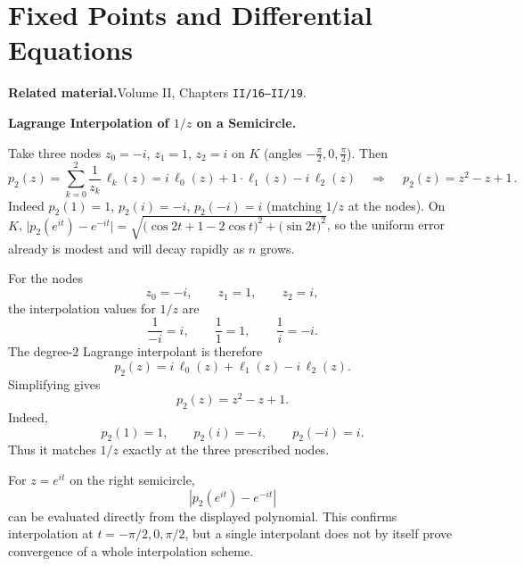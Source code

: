 \section{Fixed Points and Differential Equations}

\par\medskip\noindent\textbf{Related material.}\quad  Volume II, Chapters \texttt{II/16--II/19}.

\begin{problem}[CP-II-0018]
\label{prob:cp-ii-0018}
\textbf{Lagrange Interpolation of \(1/z\) on a Semicircle.}

\hspace*{1.5em}Take three nodes $z_0=-i$, $z_1=1$, $z_2=i$ on $K$ (angles $-\tfrac\pi2,0,\tfrac\pi2$).
	Then
	\[
	p_2(z)=\sum_{k=0}^{2}\frac{1}{z_k}\,\ell_k(z)
	= i\,\ell_0(z)+1\cdot \ell_1(z)-i\,\ell_2(z)
	\quad\Rightarrow\quad
	\boxed{\,p_2(z)=z^2 - z + 1\,}.
	\]
	Indeed $p_2(1)=1$, $p_2(i)=-i$, $p_2(-i)=i$ (matching $1/z$ at the nodes). On $K$,
	$\big|p_2(e^{it})-e^{-it}\big|
	=\sqrt{\big(\cos2t+1-2\cos t\big)^2+\big(\sin2t\big)^2}$,
	so the uniform error already is modest and will decay rapidly as $n$ grows.
\end{problem}

\begin{solution}
For the nodes
\[
z_0=-i,\qquad z_1=1,\qquad z_2=i,
\]
the interpolation values for \(1/z\) are
\[
\frac1{-i}=i,
\qquad
\frac11=1,
\qquad
\frac1i=-i.
\]
The degree-\(2\) Lagrange interpolant is therefore
\[
p_2(z)
=
i\,\ell_0(z)
+
\ell_1(z)
-
i\,\ell_2(z).
\]
Simplifying gives
\[
\boxed{
p_2(z)=z^2-z+1.
}
\]
Indeed,
\[
p_2(1)=1,
\qquad
p_2(i)=-i,
\qquad
p_2(-i)=i.
\]
Thus it matches \(1/z\) exactly at the three prescribed nodes.

For \(z=e^{it}\) on the right semicircle,
\[
\left|
p_2(e^{it})-e^{-it}
\right|
\]
can be evaluated directly from the displayed polynomial. This confirms interpolation at
\(t=-\pi/2,0,\pi/2\), but a single interpolant does not by itself prove convergence of a
whole interpolation scheme.
\end{solution}


